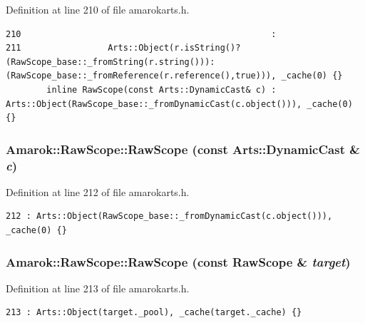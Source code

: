 Definition at line 210 of file amarokarts.h.



\footnotesize\begin{verbatim}210                                                 :
211                 Arts::Object(r.isString()?(RawScope_base::_fromString(r.string())):(RawScope_base::_fromReference(r.reference(),true))), _cache(0) {}
        inline RawScope(const Arts::DynamicCast& c) : Arts::Object(RawScope_base::_fromDynamicCast(c.object())), _cache(0) {}
\end{verbatim}\normalsize 
{}
\subsubsection{\setlength{\rightskip}{0pt plus 5cm}Amarok::Raw\-Scope::Raw\-Scope (const Arts::Dynamic\-Cast \& {\em c})\hspace{0.3cm}{\tt  [inline]}}\label{classAmarok_1_1RawScope_Amarok_1_1RawScopea3}




Definition at line 212 of file amarokarts.h.



\footnotesize\begin{verbatim}212 : Arts::Object(RawScope_base::_fromDynamicCast(c.object())), _cache(0) {}
\end{verbatim}\normalsize 
{}
\subsubsection{\setlength{\rightskip}{0pt plus 5cm}Amarok::Raw\-Scope::Raw\-Scope (const {\bf Raw\-Scope} \& {\em target})\hspace{0.3cm}{\tt  [inline]}}\label{classAmarok_1_1RawScope_Amarok_1_1RawScopea4}




Definition at line 213 of file amarokarts.h.



\footnotesize\begin{verbatim}213 : Arts::Object(target._pool), _cache(target._cache) {}
\end{verbatim}\normalsize 
{}
